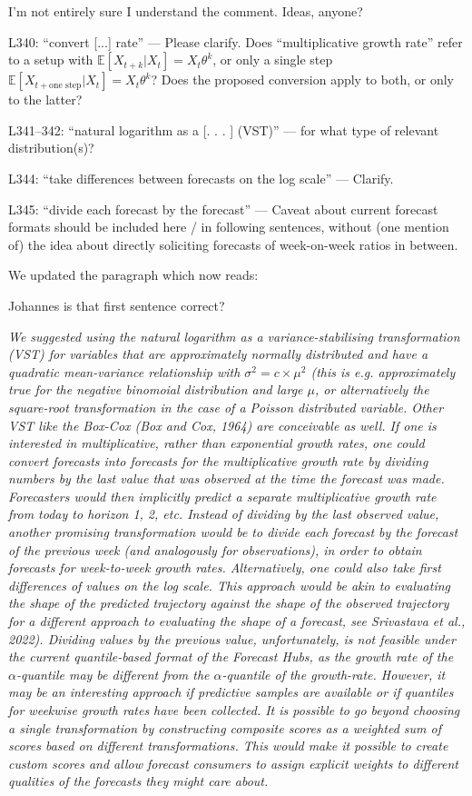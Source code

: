 \documentclass{article}
\newcommand{\red}{\color{red}}
\newcommand{\black}{\color{black}}
\begin{document}
\black
I'm not entirely sure I understand the comment. Ideas, anyone? 

\red
L340: “convert [...] rate” — Please clarify. Does “multiplicative growth rate” refer to a setup with $\mathbb{E}[X_{t+k} | X_t] = X_t \theta^k$, or only a single step $\mathbb{E}[X_{t+\text{one step}} | X_t] = X_t \theta^k$? Does the proposed conversion apply to both, or only to the latter?

L341–342: “natural logarithm as a [. . . ] (VST)” — for what type of relevant distribution(s)?

L344: “take differences between forecasts on the log scale” — Clarify.

L345: “divide each forecast by the forecast” — Caveat about current forecast formats should be included here / in following sentences, without (one mention of) the idea about directly soliciting forecasts of week-on-week ratios in between.

\black
We updated the paragraph which now reads:

Johannes is that first sentence correct? 

\textit{We suggested using the natural logarithm as a variance-stabilising transformation (VST) for variables that are approximately normally distributed and have a quadratic mean-variance relationship with $\sigma^2 = c \times \mu^2$ (this is e.g. approximately true for the negative binomoial distribution and large $\mu$, or alternatively the square-root transformation in the case of a Poisson distributed variable. Other VST like the Box-Cox (Box and Cox, 1964) are conceivable as well.
If one is interested in multiplicative, rather than exponential growth rates, one could convert forecasts into forecasts for the multiplicative growth rate by dividing numbers by the last value that was observed at the time the forecast was made. Forecasters would then implicitly predict a separate multiplicative growth rate from today to horizon 1, 2, etc. 
Instead of dividing by the last observed value, another promising transformation would be to divide each forecast by the forecast of the previous week (and analogously for observations), in order to obtain forecasts for week-to-week growth rates. Alternatively, one could also take first differences of values on the log scale. This approach would be akin to evaluating the shape of the predicted trajectory against the shape of the observed trajectory for a different approach to evaluating the shape of a forecast, see Srivastava et al., 2022). Dividing values by the previous value, unfortunately, is not feasible under the current quantile-based format of the Forecast Hubs, as the growth rate of the $\alpha$-quantile may be different from the $\alpha$-quantile of the growth-rate. However, it may be an interesting approach if predictive samples are available or if quantiles for weekwise growth rates have been collected. It is possible to go beyond choosing a single transformation by constructing composite scores as a weighted sum of scores based on different transformations. This would make it possible to create custom scores and allow forecast consumers to assign explicit weights to different qualities of the forecasts they might care about.
}
\end{document}

